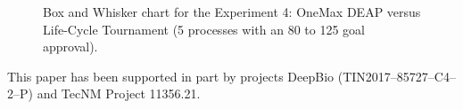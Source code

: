 \documentclass[graybox]{svmult}
\begin{document}
\begin{figure}
    \caption{Box and Whisker chart for the Experiment 4: OneMax DEAP versus Life-Cycle Tournament (5 processes with an 80 to 125 goal approval).} \label{fig.experiment4}
    \end{figure}




\begin{acknowledgement}
    This paper has been supported in part by projects DeepBio (TIN2017--85727--C4--2--P) and TecNM Project 11356.21\@.
\end{acknowledgement}

%


\end{document}
